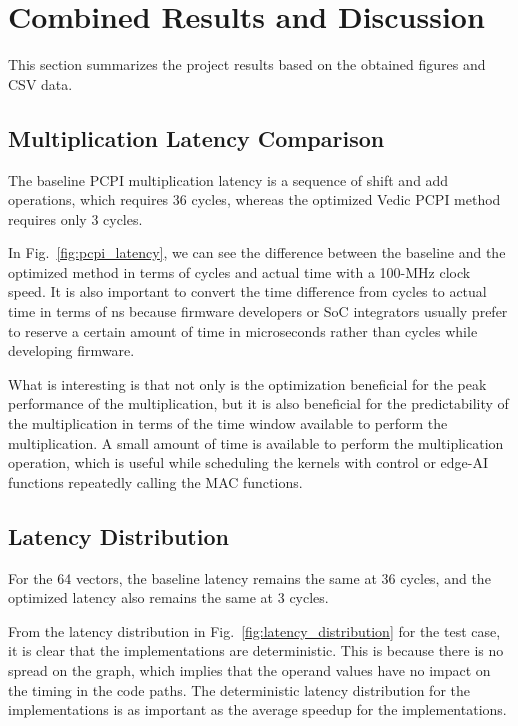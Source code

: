 \section{Combined Results and Discussion}
\label{sec:results}

This section summarizes the project results based on the obtained figures and CSV data.

\subsection{Multiplication Latency Comparison}
The baseline PCPI multiplication latency is a sequence of shift and add operations, which requires 36 cycles, whereas the optimized Vedic PCPI method requires only 3 cycles.

In Fig.~\ref{fig:pcpi_latency}, we can see the difference between the baseline and the optimized method in terms of cycles and actual time with a 100-MHz clock speed. It is also important to convert the time difference from cycles to actual time in terms of ns because firmware developers or SoC integrators usually prefer to reserve a certain amount of time in microseconds rather than cycles while developing firmware.

What is interesting is that not only is the optimization beneficial for the peak performance of the multiplication, but it is also beneficial for the predictability of the multiplication in terms of the time window available to perform the multiplication. A small amount of time is available to perform the multiplication operation, which is useful while scheduling the kernels with control or edge-AI functions repeatedly calling the MAC functions.



\subsection{Latency Distribution}
For the 64 vectors, the baseline latency remains the same at 36 cycles, and the optimized latency also remains the same at 3 cycles.

From the latency distribution in Fig.~\ref{fig:latency_distribution} for the test case, it is clear that the implementations are deterministic. This is because there is no spread on the graph, which implies that the operand values have no impact on the timing in the code paths. The deterministic latency distribution for the implementations is as important as the average speedup for the implementations.

